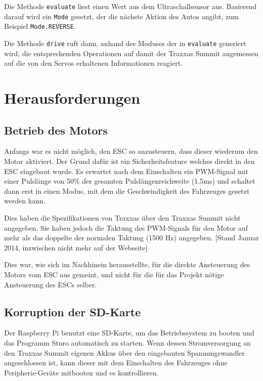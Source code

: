 \documentclass[a4paper,10pt]{scrartcl}
\begin{document}
    Die Methode \lstinline{evaluate} liest einen Wert aus dem Ultraschallsensor
    aus.
    Basierend darauf wird ein \lstinline{Mode} gesetzt, der die nächste Aktion
    des Autos angibt, zum Beispiel \lstinline{Mode.REVERSE}.

    Die Methode \lstinline{drive} ruft dann, anhand des Moduses der in
    \lstinline{evaluate} generiert wird, die entsprechenden Operationen auf
    damit der Traxxas Summit angemessen auf die von den Servos erhaltenen
    Informationen reagiert.

\section{Herausforderungen}

  \subsection{Betrieb des Motors}

    Anfangs war es nicht möglich, den ESC so anzusteuern, dass dieser wiederum
    den Motor aktiviert.
    Der Grund dafür ist ein Sicherheitsfeature welches direkt in den ESC
    eingebaut wurde.
    Es erwartet nach dem Einschalten ein PWM-Signal mit einer Pulslänge von
    50\% der gesamten Pulslängenreichweite (1.5ms) und schaltet dann erst in
    einen Modus, mit dem die Geschwindigkeit des Fahrzeuges gesetzt werden kann.

    Dies haben die Spezifikationen von Traxxas über den Traxxas Summit nicht
    angegeben.
    Sie haben jedoch die Taktung des PWM-Signals für den Motor auf mehr als das
    doppelte der normalen Taktung (1500 Hz) angegeben. \cite{traxxasspecs}
    [Stand Januar 2014, inzwischen nicht mehr auf der Webseite]

    Dies war, wie sich im Nachhinein herausstellte, für die direkte Ansteuerung
    des Motors vom ESC aus gemeint, und nicht für die für das Projekt nötige
    Ansteuerung des ESCs selber.

  \subsection{Korruption der SD-Karte}

    Der Raspberry Pi benutzt eine SD-Karte, um das Betriebssystem zu booten und
    das Programm Sturo automatisch zu starten.
    Wenn dessen Stromversorgung an den Traxxas Summit eigenen Akkus über den
    eingebauten Spannungswandler angeschlossen ist, kann dieser mit dem
    Einschalten des Fahrzeuges ohne Peripherie-Geräte mitbooten und es
    kontrollieren.
\end{document}
